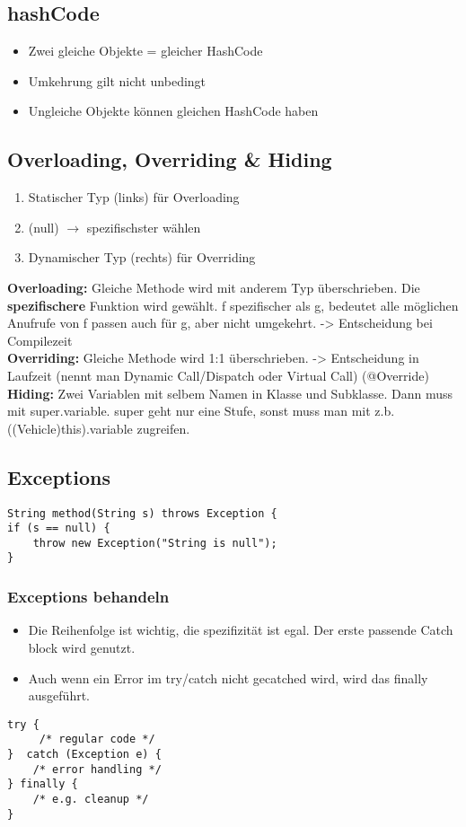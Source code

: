\begin{multicols*}{5}
	\subsection{hashCode}
		\begin{itemize}
			\item Zwei gleiche Objekte = gleicher HashCode
			\item Umkehrung gilt nicht unbedingt
			\item Ungleiche Objekte können gleichen HashCode haben
		\end{itemize}
	\subsection{Overloading, Overriding \& Hiding}
	\begin{enumerate}
		\item Statischer Typ (links) für Overloading
		\item (null) $\rightarrow$ spezifischster wählen
		\item Dynamischer Typ (rechts) für Overriding
	\end{enumerate}
	\textbf{Overloading:} Gleiche Methode wird mit anderem Typ überschrieben. Die \textbf{spezifischere} Funktion wird gewählt. f spezifischer als g, bedeutet alle möglichen Anufrufe von f passen auch für g, aber nicht umgekehrt. -> Entscheidung bei Compilezeit \\
	\textbf{Overriding:} Gleiche Methode wird 1:1 überschrieben. -> Entscheidung in Laufzeit (nennt man Dynamic Call/Dispatch oder Virtual Call) (@Override) \\
	\textbf{Hiding:} Zwei Variablen mit selbem Namen in Klasse und Subklasse. Dann muss mit super.variable. super geht nur eine Stufe, sonst muss man mit z.b. ((Vehicle)this).variable zugreifen.
	
	\subsection{Exceptions}
	\begin{lstlisting}
String method(String s) throws Exception {
if (s == null) {
	throw new Exception("String is null"); 
} 
		\end{lstlisting}
		
		\subsubsection{Exceptions behandeln}
		\begin{itemize}
			\item Die Reihenfolge ist wichtig, die spezifizität ist egal. Der erste passende Catch block wird genutzt.
			\item Auch wenn ein Error im try/catch nicht gecatched wird, wird das finally ausgeführt.
		\end{itemize}
		\begin{lstlisting}
try {
	 /* regular code */ 
}  catch (Exception e) {
	/* error handling */
} finally {
	/* e.g. cleanup */ 
}
		\end{lstlisting}

\end{multicols*}
